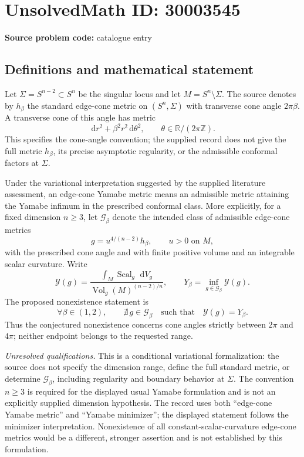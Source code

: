\documentclass[11pt]{article}
\newcommand{\Z}{\mathbb{Z}}
\newcommand{\R}{\mathbb{R}}
\newcommand{\dd}{\,\mathrm{d}}
\begin{document}
\section*{UnsolvedMath ID: 30003545}
\textbf{Source problem code:} catalogue entry
\subsection{Definitions and mathematical statement}
Let \(\Sigma=S^{n-2}\subset S^n\) be the singular locus and let \(M=S^n\setminus\Sigma\). The source denotes by \(h_\beta\) the standard edge-cone metric on \((S^n,\Sigma)\) with transverse cone angle \(2\pi\beta\). A transverse cone of this angle has metric
\[
\dd r^2+\beta^2r^2\dd\theta^2,
\qquad \theta\in\R/(2\pi\Z).
\]
This specifies the cone-angle convention; the supplied record does not give the full metric \(h_\beta\), its precise asymptotic regularity, or the admissible conformal factors at \(\Sigma\).

Under the variational interpretation suggested by the supplied literature assessment, an edge-cone Yamabe metric means an admissible metric attaining the Yamabe infimum in the prescribed conformal class. More explicitly, for a fixed dimension \(n\geq3\), let \(\mathcal G_\beta\) denote the intended class of admissible edge-cone metrics
\[
g=u^{4/(n-2)}h_\beta,\qquad u>0\text{ on }M,
\]
with the prescribed cone angle and with finite positive volume and an integrable scalar curvature. Write
\[
\mathcal Y(g)=
\frac{\displaystyle\int_M\operatorname{Scal}_g\,\dd V_g}
{\displaystyle\operatorname{Vol}_g(M)^{(n-2)/n}},
\qquad
Y_\beta=\inf_{g\in\mathcal G_\beta}\mathcal Y(g).
\]
The proposed nonexistence statement is
\[
\forall\beta\in(1,2),\qquad
\nexists\,g\in\mathcal G_\beta
\quad\text{such that}\quad
\mathcal Y(g)=Y_\beta.
\]
Thus the conjectured nonexistence concerns cone angles strictly between \(2\pi\) and \(4\pi\); neither endpoint belongs to the requested range.

\emph{Unresolved qualifications.} This is a conditional variational formalization: the source does not specify the dimension range, define the full standard metric, or determine \(\mathcal G_\beta\), including regularity and boundary behavior at \(\Sigma\). The convention \(n\geq3\) is required for the displayed usual Yamabe formulation and is not an explicitly supplied dimension hypothesis. The record uses both ``edge-cone Yamabe metric'' and ``Yamabe minimizer''; the displayed statement follows the minimizer interpretation. Nonexistence of all constant-scalar-curvature edge-cone metrics would be a different, stronger assertion and is not established by this formulation.
\end{document}
